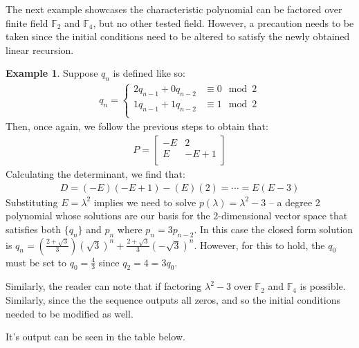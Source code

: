 \documentclass[a4paper]{article}
\theoremstyle{definition}
\newtheorem{example}{Example}[section]
\begin{document}
The next example showcases the characteristic polynomial can be factored over finite field
$\mathbb{F}_2$ and $\mathbb{F}_4$, but no other tested field. However, a precaution needs to be taken
since the initial conditions need to be altered to satisfy the newly obtained linear recursion. 
\\
\begin{example}
Suppose $q_n$ is defined like so:
\begin{align*}
q_n=
\begin{cases}
2q_{n-1}+0q_{n-2} & \equiv 0 \mod 2 \\
1q_{n-1}+1q_{n-2} & \equiv 1 \mod 2 \\
\end{cases}
\end{align*}
Then, once again, we follow the previous steps to obtain that:
\begin{align*}
P=
\begin{bmatrix}
   -E &    2 \\
    E & -E+1 \\
\end{bmatrix}
\end{align*}
Calculating the determinant, we find that:
\begin{align*}
D=(-E)(-E+1)-(E)(2)=\cdots=E(E-3)
\end{align*}
Substituting $E=\lambda^2$ implies we need to solve $p(\lambda)=\lambda^2-3$ -- a degree 2 polynomial
whose solutions are our basis for the 2-dimensional vector space that satisfies both $\{q_n\}$ and
${p_n}$ where $p_n=3p_{n-2}$. In this case the closed form solution is
$q_n=\left(\frac{2+\sqrt{3}}{3}\right)(\sqrt{3})^n+\frac{2+\sqrt{3}}{3}(-\sqrt{3})^n$. However, for this
to hold, the $q_0$ must be set to $q_0=\frac{4}{3}$ since $q_2={4}=3q_0$. 

Similarly, the reader can note that if factoring $\lambda^2-3$ over $\mathbb{F}_2$ and $\mathbb{F}_4$ is
possible. Similarly, since the the sequence outputs all zeros, and so the initial conditions needed to
be modified as well. 

It's output can be seen in the table below.


\end{example}
\end{document}
